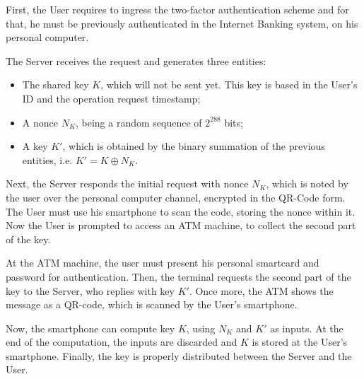 First, the User requires to ingress the two-factor authentication scheme and for that, he must be previously authenticated in the Internet Banking system, on his personal computer.

The Server receives the request and generates three entities:

\begin{itemize}
  \item The shared key $K$, which will not be sent yet. This key is based in the User's ID and the operation request timestamp;

  \item A nonce $N_K$, being a random sequence of $2^{288}$ bits;

  \item A key $K'$, which is obtained by the binary summation of the previous entities, i.e. $K' = K \oplus N_K$.
\end{itemize}

Next, the Server responds the initial request with nonce $N_K$, which is noted by the user over the personal computer channel, encrypted in the QR-Code form. The User must use his smartphone to scan the code, storing the nonce within it. Now the User is prompted to access an ATM machine, to collect the second part of the key.

At the ATM machine, the user must present his personal smartcard and password for authentication. Then, the terminal requests the second part of the key to the Server, who replies with key $K'$. Once more, the ATM shows the message as a QR-code, which is scanned by the User's smartphone.

Now, the smartphone can compute key $K$, using $N_K$ and $K'$ as inputs. At the end of the computation, the inputs are discarded and $K$ is stored at the User's smartphone. Finally, the key is properly distributed between the Server and the User.


